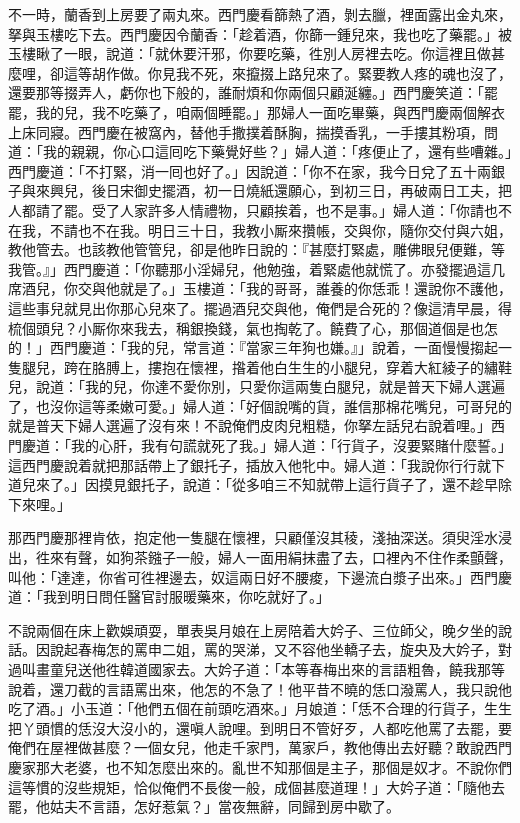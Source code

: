 不一時，蘭香到上房要了兩丸來。西門慶看篩熱了酒，剝去臘，裡面露出金丸來，拏與玉樓吃下去。西門慶因令蘭香：「趁着酒，你篩一鍾兒來，我也吃了藥罷。」被玉樓瞅了一眼，{}說道：「就休要汗邪，你要吃藥，徃別人房裡去吃。{}你這裡且做甚麼哩，卻這等胡作做。你見我不死，來攛掇上路兒來了。緊要教人疼的魂也沒了，還要那等掇弄人，虧你也下般的，誰耐煩和你兩個只顧涎纏。」西門慶笑道：「罷罷，我的兒，我不吃藥了，咱兩個睡罷。」那婦人一面吃畢藥，與西門慶兩個解衣上床同寢。西門慶在被窩內，替他手撒撲着酥胸，揣摸香乳，一手摟其粉項，問道：「我的親親，你心口這囘吃下藥覺好些？」{}婦人道：「疼便止了，還有些嘈雜。」西門慶道：「不打緊，消一囘也好了。」因說道：「你不在家，我今日兌了五十兩銀子與來興兒，後日宋御史擺酒，初一日燒紙還願心，到初三日，再破兩日工夫，把人都請了罷。受了人家許多人情禮物，只顧挨着，也不是事。」婦人道：「你請也不在我，不請也不在我。明日三十日，我教小厮來攢帳，交與你，隨你交付與六姐，教他管去。也該教他管管兒，卻是他昨日說的：『甚麼打緊處，雕佛眼兒便難，等我管。』」西門慶道：「你聽那小淫婦兒，他勉強，着緊處他就慌了。亦發擺過這几席酒兒，你交與他就是了。」{}玉樓道：「我的哥哥，誰養的你恁乖！還說你不護他，這些事兒就見出你那心兒來了。擺過酒兒交與他，俺們是合死的？像這清早晨，得梳個頭兒？小厮你來我去，稱銀換錢，氣也掏乾了。饒費了心，那個道個是也怎的！」{}西門慶道：「我的兒，常言道：『當家三年狗也嫌。』」說着，一面慢慢搊起一隻腿兒，{}跨在胳膊上，摟抱在懷裡，揝着他白生生的小腿兒，穿着大紅綾子的繡鞋兒，說道：「我的兒，你達不愛你別，只愛你這兩隻白腿兒，就是普天下婦人選遍了，也沒你這等柔嫩可愛。」{}婦人道：「好個說嘴的貨，誰信那棉花嘴兒，可哥兒的就是普天下婦人選遍了沒有來！不說俺們皮肉兒粗糙，你拏左話兒右說着哩。」西門慶道：「我的心肝，我有句謊就死了我。」婦人道：「行貨子，沒要緊賭什麼誓。」{}這西門慶說着就把那話帶上了銀托子，插放入他牝中。婦人道：「我說你行行就下道兒來了。」因摸見銀托子，說道：「從多咱三不知就帶上這行貨子了，還不趁早除下來哩。」

那西門慶那裡肯依，抱定他一隻腿在懷裡，只顧僅沒其稜，淺抽深送。須臾淫水浸出，徃來有聲，如狗茶鏹子一般，婦人一面用絹抹盡了去，口裡內不住作柔顫聲，叫他：「達達，你省可徃裡邊去，奴這兩日好不腰痠，下邊流白漿子出來。」西門慶道：「我到明日問任醫官討服暖藥來，你吃就好了。」

不說兩個在床上歡娛頑耍，單表吳月娘在上房陪着大妗子、三位師父，晚夕坐的說話。因說起春梅怎的罵申二姐，罵的哭涕，又不容他坐轎子去，旋央及大妗子，對過叫畫童兒送他徃韓道國家去。大妗子道：「本等春梅出來的言語粗魯，饒我那等說着，還刀截的言語罵出來，他怎的不急了！他平昔不曉的恁口潑罵人，我只說他吃了酒。」小玉道：「他們五個在前頭吃酒來。」月娘道：「恁不合理的行貨子，生生把丫頭慣的恁沒大沒小的，還嗔人說哩。到明日不管好歹，人都吃他罵了去罷，要俺們在屋裡做甚麼？{}一個女兒，他走千家門，萬家戶，教他傳出去好聽？敢說西門慶家那大老婆，也不知怎麼出來的。亂世不知那個是主子，那個是奴才。不說你們這等慣的沒些規矩，恰似俺們不長俊一般，成個甚麼道理！」大妗子道：「隨他去罷，他姑夫不言語，怎好惹氣？」當夜無辭，同歸到房中歇了。

